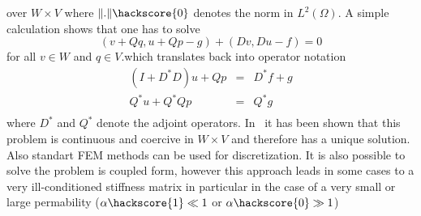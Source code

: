 over $W \times V$ where $\|.\|\hackscore{0}$ denotes the norm in $L^2(\Omega)$. A simple calculation shows that
one has to solve
\begin{equation}
( v + Qq , u + Qp - g) + (Dv,Du-f) =0 
\end{equation} 
for all $v\in W$ and $q \in V$.which translates back into operator notation
\begin{equation}
\begin{array}{rcl}
(I+D^*D)u + Qp & = & D^*f + g \\
Q^*u  + Q^*Q p & = & Q^*g \\ 
\end{array}
\end{equation} 
where $D^*$ and $Q^*$ denote the adjoint operators. 
In~\cite{XXX} it has been shown that this problem is continuous and coercive in $W \times V$ and therefore has a unique solution. Also standart FEM methods can be used for discretization. It is also possible 
to solve the problem is coupled form, however this approach leads in some cases to a very ill-conditioned stiffness matrix in particular in the case of a very small or large permability ($\alpha\hackscore{1} \ll 1$ or $\alpha\hackscore{0} \gg 1$)  

